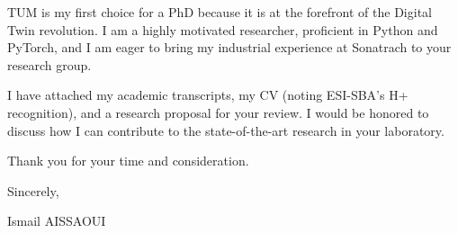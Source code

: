 \documentclass[11pt,a4paper]{article}
\begin{document}
TUM is my first choice for a PhD because it is at the forefront of the Digital Twin revolution. I am a highly motivated researcher, proficient in Python and PyTorch, and I am eager to bring my industrial experience at Sonatrach to your research group.

I have attached my academic transcripts, my CV (noting ESI-SBA's H+ recognition), and a research proposal for your review. I would be honored to discuss how I can contribute to the state-of-the-art research in your laboratory.

Thank you for your time and consideration.

Sincerely,

\bigskip

\noindent Ismail AISSAOUI
\end{document}
